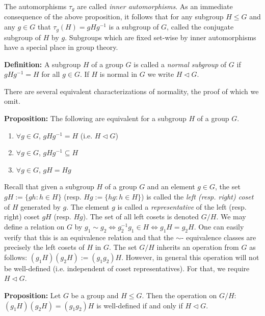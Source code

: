 \documentclass[12pt]{article}
\newcommand{\vs}{\vskip10pt}
\begin{document}
	The automorphisms $\tau_g$ are called \textit{inner automorphisms}. As an immediate consequence of the above proposition, it follows that for any subgroup $H \leq G$ and any $g \in G$ that $\tau_g(H) = gHg^{-1}$ is a subgroup of $G$, called the conjugate subgroup of $H$ by $g$. Subgroups which are fixed set-wise by inner automorphisms have a special place in group theory. 
	
	\vs 
	
	\textbf{Definition: } A subgroup $H$ of a group $G$ is called a \textit{normal subgroup} of $G$ if $gHg^{-1} = H$ for all $g \in G$. If $H$ is normal in $G$ we write $H \triangleleft G$.
	
	\vs 
	
	There are several equivalent characterizations of normality, the proof of which we omit. 
	
	\vs 
	
	\textbf{Proposition: } The following are equivalent for a subgroup $H$ of a group $G$. 
	
	\begin{enumerate}[label = (\alph*)]
		\item $\forall g \in G$, $gHg^{-1} = H$ (i.e. $H \triangleleft G$)
		\item $\forall g \in G$, $gHg^{-1} \subseteq H$
		\item $\forall g \in G$, $gH = Hg$
	\end{enumerate}
	
	\vs 
	
	Recall that given a subgroup $H$ of a group $G$ and an element $g \in G$, the set $gH := \{gh: h \in H\}$ (resp. $Hg := \{hg: h \in H\}$) is called the \textit{left (resp. right) coset} of $H$ generated by $g$. The element $g$ is called a \textit{representative} of the left (resp. right) coset $gH$ (resp. $Hg$). The set of all left cosets is denoted $G/H$. We may define a relation on $G$ by $g_1 \sim g_2 \iff g_2^{-1} g_1 \in H \iff g_1 H = g_2 H$. One can easily verify that this is an equivalence relation and that the $\sim$- equivalence classes are precisely the left cosets of $H$ in $G$. The set $G/H$ inherits an operation from $G$ as follows: $(g_1H)(g_2H) := (g_1 g_2)H$. However, in general this operation will not be well-defined (i.e. independent of coset representatives). For that, we require $H \triangleleft G$. 
	
	\vs
	
	\textbf{Proposition: } Let $G$ be a group and $H \leq G$. Then the operation on $G/H$: $(g_1 H) (g_2 H) = (g_1 g_2) H$ is well-defined if and only if $H \triangleleft G$. 
	
\end{document}
